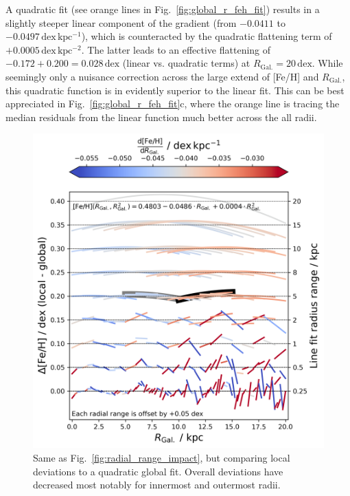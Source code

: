 \documentclass[fleqn,usenatbib]{mnras}
\begin{document}
A quadratic fit (see orange lines in Fig.~\ref{fig:global_r_feh_fit}) results in a slightly steeper linear component of the gradient (from $-0.0411$ to $-0.0497\,\mathrm{dex\,kpc^{-1}}$), which is counteracted by the quadratic flattening term of $+0.0005\,\mathrm{dex\,kpc^{-2}}$. The latter leads to an effective flattening of $-0.172 + 0.200 = 0.028\,\mathrm{dex}$ (linear vs. quadratic terms) at $R_\mathrm{Gal.} = 20\,\mathrm{dex}$. While seemingly only a nuisance correction across the large extend of [Fe/H] and $R_\mathrm{Gal.}$, this quadratic function is in evidently superior to the linear fit. This can be best appreciated in Fig.~\ref{fig:global_r_feh_fit}c, where the orange line is tracing the median residuals from the linear function much better across the all radii.

\begin{figure}
    \centering
    \includegraphics[width=\columnwidth]{figures/radial_range_impact_quadratic.png}
    \caption{Same as Fig.~\ref{fig:radial_range_impact}, but comparing local deviations to a quadratic global fit. Overall deviations have decreased most notably for innermost and outermost radii.}
    \label{fig:radial_range_impact_quadratic}
\end{figure}
\end{document}
